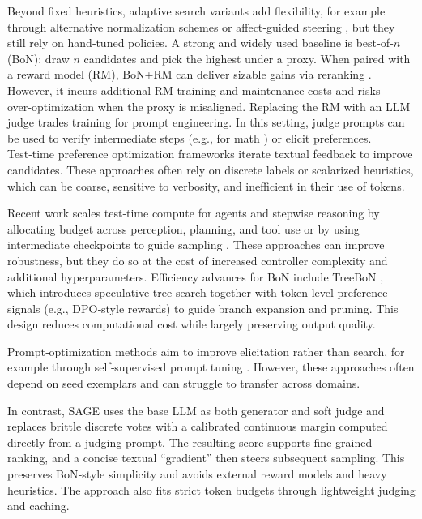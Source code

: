 \documentclass[11pt]{article}
\theoremstyle{plain}
\theoremstyle{definition}
\theoremstyle{remark}
\newcommand{\method}{SAGE}
\begin{document}
Beyond fixed heuristics, adaptive search variants add flexibility, for example through alternative normalization schemes or affect‑guided steering \citep{freitag2017beam,huang2023affective}, but they still rely on hand‑tuned policies. A strong and widely used baseline is best‑of‑\(n\) (BoN): draw \(n\) candidates and pick the highest under a proxy. When paired with a reward model (RM), BoN+RM can deliver sizable gains via reranking \citep[e.g., human‑feedback pipelines such as][]{stiennon2020learning}. However, it incurs additional RM training and maintenance costs and risks over‑optimization when the proxy is misaligned. Replacing the RM with an LLM judge trades training for prompt engineering. In this setting, judge prompts can be used to verify intermediate steps (e.g., for math \citep{mahdavi2025scaling}) or elicit preferences. Test‑time preference optimization frameworks \citep{litest} iterate textual feedback to improve candidates. These approaches often rely on discrete labels or scalarized heuristics, which can be coarse, sensitive to verbosity, and inefficient in their use of tokens.

Recent work scales test‑time compute for agents and stepwise reasoning by allocating budget across perception, planning, and tool use \citep{zhu2025scaling} or by using intermediate checkpoints to guide sampling \citep{wang2025stepwise}. These approaches can improve robustness, but they do so at the cost of increased controller complexity and additional hyperparameters. Efficiency advances for BoN include TreeBoN \citep{qiu2024treebon}, which introduces speculative tree search together with token‑level preference signals (e.g., DPO‑style rewards) to guide branch expansion and pruning. This design reduces computational cost while largely preserving output quality.

Prompt‑optimization methods aim to improve elicitation rather than search, for example through self‑supervised prompt tuning \citep{xiang2025self}. However, these approaches often depend on seed exemplars and can struggle to transfer across domains.

In contrast, \method{} uses the base LLM as both generator and soft judge and replaces brittle discrete votes with a calibrated continuous margin computed directly from a judging prompt. The resulting score supports fine‑grained ranking, and a concise textual “gradient” then steers subsequent sampling. This preserves BoN‑style simplicity and avoids external reward models and heavy heuristics. The approach also fits strict token budgets through lightweight judging and caching.
\end{document}
